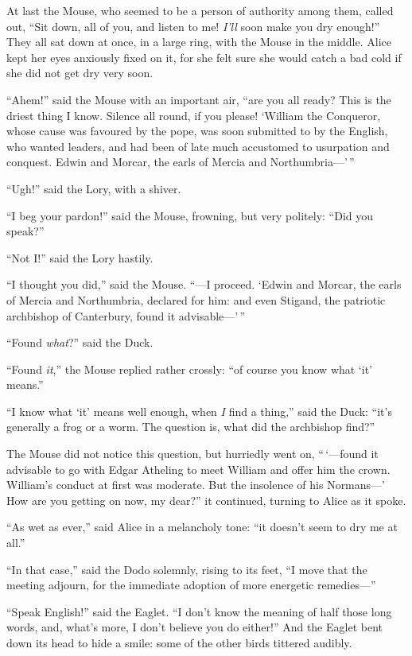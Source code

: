 \documentclass[book, 20pt]{extbook}
\begin{document}
At last the Mouse, who seemed to be a person of authority among them,
called out, ``Sit down, all of you, and listen to me! \emph{I'll} soon
make you dry enough!'' They all sat down at once, in a large ring, with
the Mouse in the middle. Alice kept her eyes anxiously fixed on it, for
she felt sure she would catch a bad cold if she did not get dry very
soon.

``Ahem!'' said the Mouse with an important air, ``are you all ready?
This is the driest thing I know. Silence all round, if you please!
`William the Conqueror, whose cause was favoured by the pope, was soon
submitted to by the English, who wanted leaders, and had been of late
much accustomed to usurpation and conquest. Edwin and Morcar, the earls
of Mercia and Northumbria---'\,''

``Ugh!'' said the Lory, with a shiver.

``I beg your pardon!'' said the Mouse, frowning, but very politely:
``Did you speak?''

``Not I!'' said the Lory hastily.

``I thought you did,'' said the Mouse. ``---I proceed. `Edwin and
Morcar, the earls of Mercia and Northumbria, declared for him: and even
Stigand, the patriotic archbishop of Canterbury, found it
advisable---'\,''

``Found \emph{what}?'' said the Duck.

``Found \emph{it},'' the Mouse replied rather crossly: ``of course you
know what `it' means.''

``I know what `it' means well enough, when \emph{I} find a thing,'' said
the Duck: ``it's generally a frog or a worm. The question is, what did
the archbishop find?''

The Mouse did not notice this question, but hurriedly went on,
``\,`---found it advisable to go with Edgar Atheling to meet William and
offer him the crown. William's conduct at first was moderate. But the
insolence of his Normans---' How are you getting on now, my dear?'' it
continued, turning to Alice as it spoke.

``As wet as ever,'' said Alice in a melancholy tone: ``it doesn't seem
to dry me at all.''

``In that case,'' said the Dodo solemnly, rising to its feet, ``I move
that the meeting adjourn, for the immediate adoption of more energetic
remedies---''

``Speak English!'' said the Eaglet. ``I don't know the meaning of half
those long words, and, what's more, I don't believe you do either!'' And
the Eaglet bent down its head to hide a smile: some of the other birds
tittered audibly.
\end{document}
